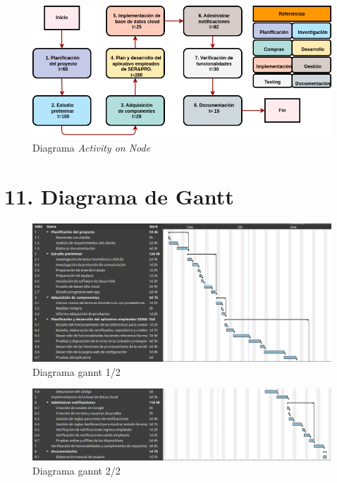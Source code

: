 \documentclass[
11pt, %
]{charter}
\begin{document}
\begin{figure}[htpb]
\centering 
\includegraphics[width=.8\textwidth]{./Figuras/AoN.png}
\caption{Diagrama \textit{Activity on Node}}
\label{fig:AoN}
\end{figure}




\section{11. Diagrama de Gantt}
\label{sec:gantt}



\begin{figure}[htpb]
\centering 
\includegraphics[width=1\textwidth]{./Figuras/ganntParte1.png}
\caption{Diagrama gannt 1/2}
\label{fig:AoN}
\end{figure}

\begin{figure}[htpb]
\centering 
\includegraphics[width=1\textwidth]{./Figuras/ganntParte2.png}
\caption{Diagrama gannt 2/2}
\label{fig:AoN}
\end{figure}
\end{document}
